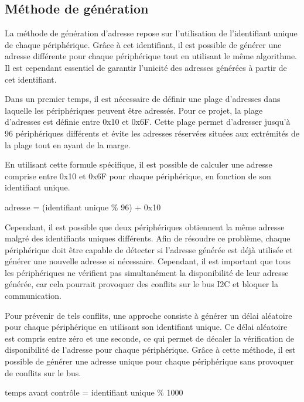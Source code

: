 \subsection{Méthode de génération}

La méthode de génération d'adresse repose sur l'utilisation de l'identifiant unique de chaque périphérique.
Grâce à cet identifiant, il est possible de générer une adresse différente pour chaque périphérique tout en utilisant le même algorithme.
Il est cependant essentiel de garantir l'unicité des adresses générées à partir de cet identifiant.

Dans un premier temps, il est nécessaire de définir une plage d'adresses dans laquelle les périphériques peuvent être adressés.
Pour ce projet, la plage d'adresses est définie entre 0x10 et 0x6F.
Cette plage permet d'adresser jusqu'à 96 périphériques différents et évite les adresses réservées situées aux extrémités de la plage tout en ayant de la marge.

En utilisant cette formule spécifique, il est possible de calculer une adresse comprise entre 0x10 et 0x6F pour chaque périphérique, en fonction de son identifiant unique.

\begin{center}
    adresse = (identifiant unique \% 96) + 0x10
\end{center}

Cependant, il est possible que deux périphériques obtiennent la même adresse malgré des identifiants uniques différents.
Afin de résoudre ce problème, chaque périphérique doit être capable de détecter si l'adresse générée est déjà utilisée et générer une nouvelle adresse si nécessaire.
Cependant, il est important que tous les périphériques ne vérifient pas simultanément la disponibilité de leur adresse générée, car cela pourrait provoquer des conflits sur le bus I2C et bloquer la communication.

Pour prévenir de tels conflits, une approche consiste à générer un délai aléatoire pour chaque périphérique en utilisant son identifiant unique.
Ce délai aléatoire est compris entre zéro et une seconde, ce qui permet de décaler la vérification de disponibilité de l'adresse pour chaque périphérique.
Grâce à cette méthode, il est possible de générer une adresse unique pour chaque périphérique sans provoquer de conflits sur le bus.

\begin{center}
    temps avant contrôle = identifiant unique \% 1000
\end{center}


